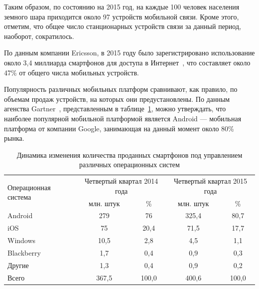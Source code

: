 Таким образом, по состоянию на 2015 год, на каждые 100 человек
населения земного шара приходится около 97 устройств мобильной связи.
Кроме этого, отметим, что общее число станционарных устройств связи
за данный период, наоборот, сократилось.

По данным компании Ericsson, в 2015 году было зарегистрировано использование
около 3{,}4 миллиарда смартфонов для доступа в Интернет~\cite{ericsson_mobility_report},
что составляет около 47\% от общего числа мобильных устройств.

Популярность различных мобильных платформ сравнивают, как правило,
по объемам продаж устройств, на которых они предустановлены.
По данным агенства Gartner~\cite{gartner_smartphone_stat}, представленным
в таблице~\ref{tbl:gartner_platform_stat}, можно утверждать, что наиболее популярной
мобильной платформой является Android --- мобильная платформа от
компании Google, занимающая на данный момент около 80\% рынка.

\begin{table} [h!]
  \caption{
    Динамика изменения количества проданных смартфонов под
    управлением различных операционных систем
  }\label{tbl:gartner_platform_stat}
    \begin{tabular}{| m{6.1cm} | c | c | c | c |}
      \hline

      \multirow{2}{*}{
      \parbox{6.1cm}{
      \smallskip
      \centering Операционная система
      \smallskip
      }
      }
      & \multicolumn{2}{c|}{
          \parbox{4.5cm}{
            \smallskip
            \centering Четвертый квартал 2014 года
            \smallskip
          }
        }
      & \multicolumn{2}{c|}{
          \parbox{4.5cm}{
            \smallskip
            \centering Четвертый квартал 2015 года
            \smallskip
          }
        } \\
      \cline{2-5}

      & млн. штук & \% & млн. штук & \% \\
      \hline

      Android &  279 & 76 & 325{,}4 & 80{,}7 \\
      \hline

      iOS &  75 & 20{,}4 & 71{,}5 & 17{,}7 \\
      \hline

      Windows & 10{,}5 & 2{,}8 & 4{,}5 & 1{,}1 \\
      \hline

      Blackberry & 1{,}7 & 0{,}4 & 0{,}9 & 0{,}3 \\
      \hline

      Другие & 1{,}3 & 0{,}4 & 0{,}9 & 0{,}2 \\
      \hline

      Всего & 367{,}5 & 100{,}0 & 400{,}6 & 100{,}0 \\
      \hline
    \end{tabular}
\end{table}

